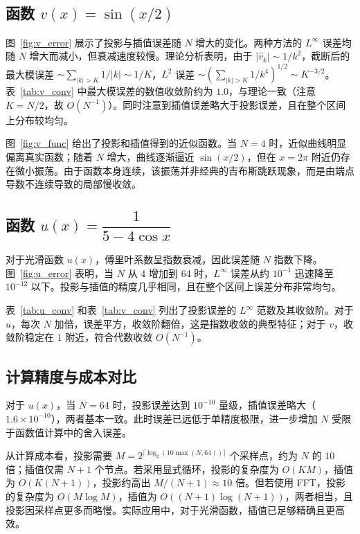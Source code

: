 \documentclass{article}
\begin{document}
\subsection{函数 $v(x)=\sin(x/2)$}
图~\ref{fig:v_error} 展示了投影与插值误差随 $N$ 增大的变化。两种方法的 $L^\infty$ 误差均随 $N$ 增大而减小，但衰减速度较慢。理论分析表明，由于 $|\hat{v}_k|\sim 1/k^2$，截断后的最大模误差 $\sim \sum_{|k|>K} 1/|k| \sim 1/K$，$L^2$ 误差 $\sim \left(\sum_{|k|>K} 1/k^4\right)^{1/2} \sim K^{-3/2}$。表~\ref{tab:v_conv} 中最大模误差的数值收敛阶约为 $1.0$，与理论一致（注意 $K=N/2$，故 $O(N^{-1})$）。同时注意到插值误差略大于投影误差，且在整个区间上分布较均匀。

图~\ref{fig:v_func} 给出了投影和插值得到的近似函数。当 $N=4$ 时，近似曲线明显偏离真实函数；随着 $N$ 增大，曲线逐渐逼近 $\sin(x/2)$，但在 $x=2\pi$ 附近仍存在微小振荡。由于函数本身连续，该振荡并非经典的吉布斯跳跃现象，而是由端点导数不连续导致的局部慢收敛。

\subsection{函数 $u(x)=\dfrac{1}{5-4\cos x}$}
对于光滑函数 $u(x)$，傅里叶系数呈指数衰减，因此误差随 $N$ 指数下降。图~\ref{fig:u_error} 表明，当 $N$ 从 4 增加到 64 时，$L^\infty$ 误差从约 $10^{-1}$ 迅速降至 $10^{-12}$ 以下。投影与插值的精度几乎相同，且在整个区间上误差分布非常均匀。

表~\ref{tab:u_conv} 和表~\ref{tab:v_conv} 列出了投影误差的 $L^\infty$ 范数及其收敛阶。对于 $u$，每次 $N$ 加倍，误差平方，收敛阶翻倍，这是指数收敛的典型特征；对于 $v$，收敛阶稳定在 $1$ 附近，符合代数收敛 $O(N^{-1})$。

\subsection{计算精度与成本对比}
对于 $u(x)$，当 $N=64$ 时，投影误差达到 $10^{-10}$ 量级，插值误差略大（$1.6\times10^{-10}$），两者基本一致。此时误差已远低于单精度极限，进一步增加 $N$ 受限于函数值计算中的舍入误差。

从计算成本看，投影需要 $M = 2^{\lceil\log_2(10\max(N,64))\rceil}$ 个采样点，约为 $N$ 的 $10$ 倍；插值仅需 $N+1$ 个节点。若采用显式循环，投影的复杂度为 $O(KM)$，插值为 $O(K(N+1))$，投影约高出 $M/(N+1)\approx 10$ 倍。但若使用 FFT，投影的复杂度为 $O(M\log M)$，插值为 $O((N+1)\log(N+1))$，两者相当，且投影因采样点更多而略慢。实际应用中，对于光滑函数，插值已足够精确且更高效。
\end{document}
